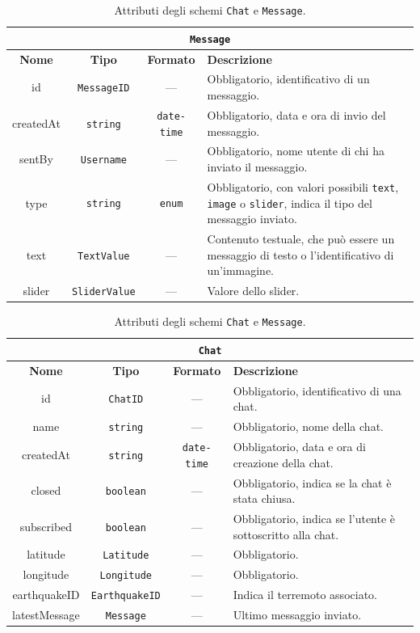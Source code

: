 \begin{table}[ht!]
\centering
\caption{Attributi degli schemi \texttt{Chat} e \texttt{Message}.}
\label{tab:chat_message}

\begin{tabular}{c|c|c|p{17em}}
\hline
\multicolumn{4}{c}{\textbf{\texttt{Message}}} \\
\hline
\textbf{Nome} & \textbf{Tipo} & \textbf{Formato} & \textbf{Descrizione} \\
\hline
id & \texttt{MessageID} & --- & Obbligatorio, identificativo di un messaggio. \\
createdAt & \texttt{string} & \texttt{date-time} & Obbligatorio, data e ora di invio del messaggio. \\
sentBy & \texttt{Username} & --- & Obbligatorio, nome utente di chi ha inviato il messaggio. \\
type & \texttt{string} & \texttt{enum} & Obbligatorio, con valori possibili \texttt{text}, \texttt{image} o \texttt{slider}, indica il tipo del messaggio inviato. \\
text & \texttt{TextValue} & --- & Contenuto testuale, che può essere un messaggio di testo o l'identificativo di un'immagine. \\
slider & \texttt{SliderValue} & --- & Valore dello slider.
\end{tabular}

\bigskip

\begin{tabular}{c|c|c|p{17em}}
\hline
\multicolumn{4}{c}{\textbf{\texttt{Chat}}} \\
\hline
\textbf{Nome} & \textbf{Tipo} & \textbf{Formato} & \textbf{Descrizione} \\
\hline
id & \texttt{ChatID} & --- & Obbligatorio, identificativo di una chat. \\
name & \texttt{string} & --- & Obbligatorio, nome della chat. \\
createdAt & \texttt{string} & \texttt{date-time} & Obbligatorio, data e ora di creazione della chat. \\
closed & \texttt{boolean} & --- & Obbligatorio, indica se la chat è stata chiusa. \\
subscribed & \texttt{boolean} & --- & Obbligatorio, indica se l'utente è sottoscritto alla chat. \\
latitude & \texttt{Latitude} & --- & Obbligatorio. \\
longitude & \texttt{Longitude} & --- & Obbligatorio. \\
earthquakeID & \texttt{EarthquakeID} & --- & Indica il terremoto associato. \\
latestMessage & \texttt{Message} & --- & Ultimo messaggio inviato. \\
\end{tabular}
\end{table}

